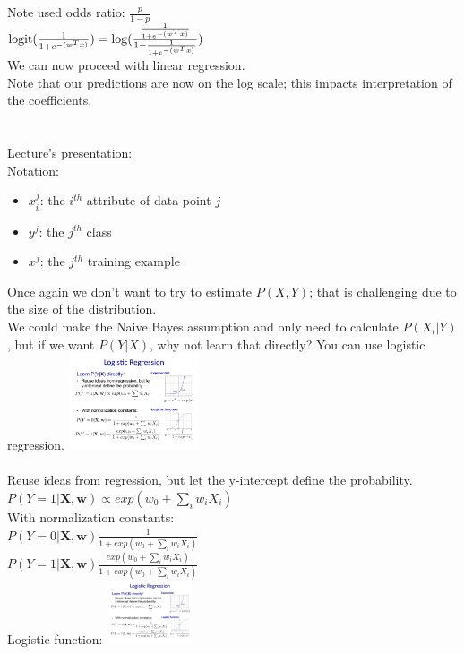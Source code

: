  


Note used odds ratio: $\frac{p}{1-p}$  \hfill \\
$\textrm{logit}(\frac{1}{1+ e^{-(w^Tx)}}) = \log(\frac{\frac{1}{1+ e^{-(w^Tx)}}}{1-\frac{1}{1+ e^{-(w^Tx)}}}) $  \hfill \\ %
We can now proceed with linear regression.  \hfill \\
Note that our predictions are now on the log scale; this impacts interpretation of the coefficients.  \hfill \\  %

\hfill \\ \hfill \\   

\underline{Lecture's presentation:} \hfill \\

Notation:  \hfill \\
\begin{itemize}
	\item $x_i^j$: the $i^{th}$ attribute of data point $j$
	\item $y^j$: the $j^{th}$ class  %
	\item $x^j$: the $j^{th}$ training example
\end{itemize}

Once again we don't want to try to estimate $P(X,Y)$; that is challenging due to the size of the distribution. \hfill \\
We could make the Naive Bayes assumption and only need to calculate $P(X_i | Y)$, 
but if we want $P(Y|X)$, why not learn that directly?  You can use logistic regression. 
\includegraphics[width=1.5in]{figures/expo.pdf}     \hfill \\
\hfill \\

Reuse ideas from regression, but let the y-intercept define the probability.  \hfill \\
$P(Y=1|\bm{X, w}) \propto exp(w_0 + \sum_i w_i X_i)$  \hfill \\
With normalization constants:  \hfill \\
$\displaystyle  P(Y=0|\bm{X, w}) \frac{1}{1+ exp(w_0 + \sum_i w_i X_i)} $ \hfill \\
$\displaystyle  P(Y=1|\bm{X, w}) \frac{exp(w_0 + \sum_i w_i X_i)}{1+ exp(w_0 + \sum_i w_i X_i)} $ \hfill \\
Logistic function: \includegraphics[width=1in]{figures/logistic.pdf}     \hfill \\
 \hfill \\
 

